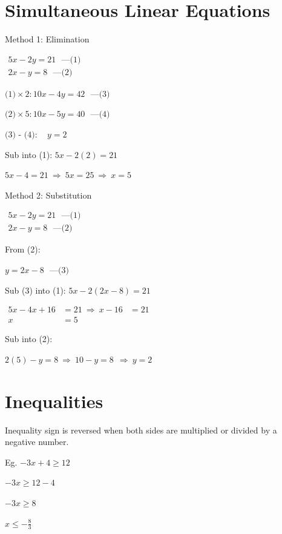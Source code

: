 \documentclass[twocolumn]{article}
\begin{document}
\section*{Simultaneous Linear Equations}

Method 1: Elimination

$
\begin{gathered}
	5 x-2 y=21 \ \ \ \text{---(1)}\\
	2 x-y=8 \ \ \ \text{---(2)}
\end{gathered}
$

$\text{(1)} \times 2: 10 x-4 y=42  \ \ \ \text{---(3)}$

$\text{(2)}\times 5: 10 x-5 y=40  \ \ \ \text{---(4)}$

$\text{(3) - (4)}: \quad y=2$

Sub into (1): $5 x-2(2)=21$

$5 x-4 =21 \ \Rightarrow \ 5 x =25 \ \Rightarrow \	x =5$

\bigskip 

\noindent 
Method 2: Substitution

$
\begin{gathered}
	5 x-2 y=21 \ \ \ \text{---(1)} \\
	2 x-y=8 \ \ \ \text{---(2)}
\end{gathered}
$

From (2):

$
y=2 x-8  \ \ \ \text{---(3)}
$

Sub (3) into (1): $5 x-2(2 x-8)=21$

$
\begin{aligned}
	5 x-4 x+16 & =21 \ \Rightarrow \ x-16 & =21 \\
	x & =5
\end{aligned}
$

Sub into (2):

$	2(5)-y=8 \ \Rightarrow \ 10-y=8 \ \ \Rightarrow  \	y=2 $

\section*{Inequalities}

\noindent 
Inequality sign is reversed when both sides are multiplied or divided by a negative number.

\bigskip 

\noindent 
Eg. $-3x + 4  \geq 12$

$-3x \geq 12-4$

$-3x \geq 8$

$x \leq - \frac{8}{3}$
\end{document}
